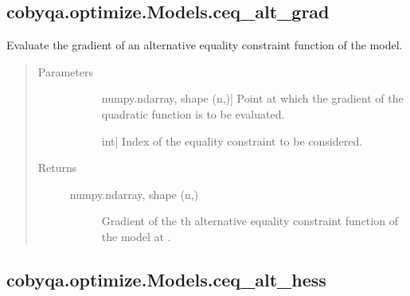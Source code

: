 \documentclass[letterpaper,10pt,english]{sphinxmanual}
\begin{document}
\begin{fulllineitems}
\subsection{cobyqa.optimize.Models.ceq\_alt\_grad}
\label{\detokenize{refs/generated/cobyqa.optimize.Models.ceq_alt_grad:cobyqa-optimize-models-ceq-alt-grad}}\label{\detokenize{refs/generated/cobyqa.optimize.Models.ceq_alt_grad::doc}}

\begin{fulllineitems}
\label{\detokenize{refs/generated/cobyqa.optimize.Models.ceq_alt_grad:cobyqa.optimize.Models.ceq_alt_grad}}
\sphinxAtStartPar
Evaluate the gradient of an alternative equality constraint function of
the model.
\begin{quote}\begin{description}
\item[{Parameters}] \leavevmode\begin{description}
\item[{}] \leavevmode{[}numpy.ndarray, shape (n,){]}
\sphinxAtStartPar
Point at which the gradient of the quadratic function is to be
evaluated.

\item[{}] \leavevmode{[}int{]}
\sphinxAtStartPar
Index of the equality constraint to be considered.

\end{description}

\item[{Returns}] \leavevmode\begin{description}
\item[{numpy.ndarray, shape (n,)}] \leavevmode
\sphinxAtStartPar
Gradient of the \sphinxhyphen{}th alternative equality constraint function of
the model at .

\end{description}

\end{description}\end{quote}

\end{fulllineitems}



\subsection{cobyqa.optimize.Models.ceq\_alt\_hess}
\label{\detokenize{refs/generated/cobyqa.optimize.Models.ceq_alt_hess:cobyqa-optimize-models-ceq-alt-hess}}\label{\detokenize{refs/generated/cobyqa.optimize.Models.ceq_alt_hess::doc}}


\end{fulllineitems}
\end{document}
